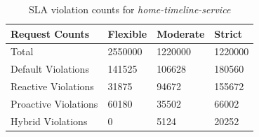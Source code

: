 \begin{table}
    \caption{SLA violation counts for \textit{home-timeline-service}}\label{tab:exp1-sla-violation-count}
    \centering
    \begin{tabular}{|l|l|l|l|}
        \hline
        Request Counts & Flexible & Moderate & Strict \\
        \hline
        Total  & \num[group-separator={,}]{2550000} & \num[group-separator={,}]{1220000} & \num[group-separator={,}]{1220000} \\
        \hline
        Default Violations & \num[group-separator={,}]{141525} & \num[group-separator={,}]{106628} & \num[group-separator={,}]{180560} \\
        Reactive Violations & \num[group-separator={,}]{31875} & \num[group-separator={,}]{94672} & \num[group-separator={,}]{155672} \\
        Proactive Violations & \num[group-separator={,}]{60180} & \num[group-separator={,}]{35502} & \num[group-separator={,}]{66002} \\
        Hybrid Violations & \num[group-separator={,}]{0} & \num[group-separator={,}]{5124} & \num[group-separator={,}]{20252} \\
         \hline
    \end{tabular}
\end{table}

